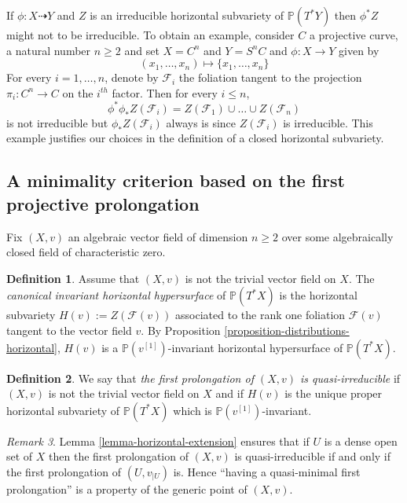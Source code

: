 \documentclass[12pt]{amsart}
\renewcommand{\P}{\mathbb{P}}
\theoremstyle{definition}
\newtheorem{definition}{Definition}[subsection]
\theoremstyle{plain}
\theoremstyle{exampstyle}
\theoremstyle{exampstyle}\newtheorem{thmxbis}{Theorem}
\numberwithin{equation}{section}
\theoremstyle{remark}
\newtheorem{remark}[definition]{Remark}
\begin{document}
{\example \label{example-notirreducible} If $\phi: X \dashrightarrow Y$ and $Z$ is an irreducible horizontal subvariety of $\P(T^\ast Y)$ then $\phi^\ast Z$ might not to be irreducible. To obtain an example, consider $C$ a projective curve, a natural number $n \geq 2$ and set $X = C^n$ and $Y = S^n C$ and $\phi : X \rightarrow Y$ given by 
$$(x_1,\ldots, x_n) \mapsto \lbrace x_1,\ldots, x_n \rbrace$$
For every $i = 1,\ldots, n$, denote by ${\mathcal F_i}$ the foliation tangent to the projection $\pi_i: C^n \rightarrow C$ on the $i^{th}$ factor. Then for every $i \leq n$, 
$$\phi^\ast \phi_\ast Z(\mathcal F_i) = Z(\mathcal F_1) \cup \ldots \cup Z(\mathcal F_n)$$
is not irreducible but $\phi_\ast Z(\mathcal F_i)$
always is since $Z(\mathcal F_i)$ is irreducible. This example justifies our choices in the definition of a closed horizontal subvariety. }





\subsection{A minimality criterion based on the first projective prolongation} Fix $(X,v)$ an algebraic vector field of dimension $n \geq 2$ over some algebraically closed field of characteristic zero. 


\begin{definition} \label{definition-canonical-invariant-hypersurface}
Assume that $(X,v)$ is not the trivial vector field on $X$. The {\em{canonical invariant horizontal hypersurface}} of $\P(T^\ast X)$ is the horizontal subvariety $ H(v):= Z(\mathcal F(v))$ associated to the rank one foliation $\mathcal F(v)$ tangent to the vector field $v$. By Proposition \ref{proposition-distributions-horizontal}, $H(v)$ is a $\mathbb{P}(v^{[1]})$-invariant horizontal hypersurface of $\P(T^\ast X)$. 
\end{definition} 

\begin{definition}  \label{definition-firstprolongationirreducible}
We say that {\em the first prolongation of $(X,v)$ is quasi-irreducible} if $(X,v)$ is not the trivial vector field on $X$ and if $H(v)$ is the unique proper horizontal subvariety of $\P(T^\ast X)$ which is $\P(v^{[1]})$-invariant. 
\end{definition} 


\begin{remark} \label{remark-quasiminimal} Lemma \ref{lemma-horizontal-extension} ensures that if $U$ is a dense open set of $X$ then the first prolongation of $(X,v)$ is quasi-irreducible  if and only if the first prolongation of $(U,v_{\mid U})$ is. Hence ``having a quasi-minimal first prolongation'' is a property of the generic point of $(X,v)$.
\end{remark} 
\end{document}
